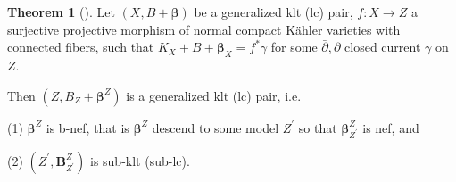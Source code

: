 \documentclass[11pt]{article}
\theoremstyle{definition}
\newtheorem{theorem}{Theorem}
\begin{document}
	\begin{theorem}[{\cite[Theorem 2.3]{HP24}}]
		Let $(X, B+\boldsymbol{\beta})$ be a generalized klt (lc) pair, $f: X \rightarrow Z$ a surjective projective morphism of normal compact Kähler varieties with connected fibers, such that $K_X+B+\boldsymbol{\beta}_X=f^* \gamma$ for some $\bar{\partial}, \partial$ closed current $\gamma$ on $Z$. 
		
		Then $\left(Z, B_Z+\boldsymbol{\beta}^Z\right)$ is a generalized klt (lc) pair, i.e.
		
		(1) $\boldsymbol{\beta}^Z$ is b-nef, that is $\boldsymbol{\beta}^Z$ descend to some model $Z^{\prime}$ so that $\boldsymbol{\beta}_{Z^{\prime}}^Z$ is nef, and
		
		(2) $\left(Z^{\prime}, \mathbf{B}_{Z^{\prime}}^Z\right)$ is sub-klt (sub-lc).
	\end{theorem}
	
	
	
\end{document}
